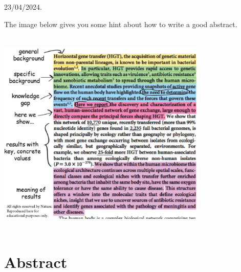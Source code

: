 \documentclass[mstat,12pt]{unswthesis}
\begin{document}
{\bigskip\bigskip\bigskip\noindent} 23/04/2024.




The image below gives you some hint about how to write a good abstract.\\
\par
\vspace{\baselineskip}
\bigskip
\includegraphics[width=10cm,height=10cm]{good-abstract.png}
\afterpage{\blankpage}
\afterpreface





%
%






\section{Abstract}\label{abstract}
\end{document}

